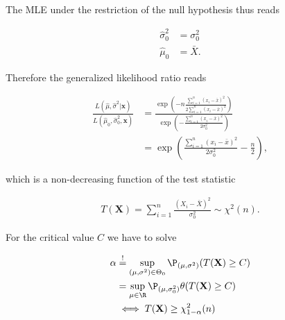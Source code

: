 \begin{solution}
The MLE under the restriction of the null hypothesis thus reads

\begin{align*}
  \hat{\sigma}_0^2 &= \sigma_0^2 \\
  \hat{\mu}_0 &= \bar{X}.
\end{align*}

Therefore the generalized likelihood ratio reads

\begin{align*}
  \frac{L(\hat{\mu}, \hat{\sigma}^2 | \textbf{x})}{L(\hat{\mu}_0, \hat{\sigma}^2_0, \textbf{x})} 
  &= \frac{\exp\left(-n\frac{\sum_{i=1}^n(x_i - \bar{x})^2}{2\sum_{i=1}^n (x_i - \bar{x})^2}\right)}
  {\exp\left(-\frac{\sum_{i=1}^n (x_i - \bar{x})^2}{2\sigma_0^2}\right)} \\
  &= \exp\left(\frac{\sum_{i=1}^n (x_i - \bar{x})^2}{2\sigma_0^2}-\frac{n}{2}\right),
\end{align*}

which is a non-decreasing function of the test statistic

\begin{align*}
  T(\textbf{X}) = \sum_{i=1}^n \frac{(X_i - \bar{X})^2}{\sigma_0^2} \sim \chi^2(n).
\end{align*}

For the critical value $C$ we have to solve

\begin{align*}
  \alpha &\stackrel{!}{=} \sup_{(\mu, \sigma^2) \in \Theta_0} \P_{(\mu, \sigma^2)}(T(\textbf{X}) \geq C) \\
  &= \sup_{\mu \in \R} \P_{(\mu, \sigma_0^2)}\theta(T(\textbf{X}) \geq C) \\
  &\iff T(\textbf{X}) \geq \chi_{1 - \alpha}^2(n)
\end{align*}
\end{solution}

